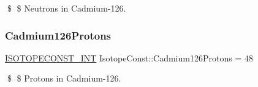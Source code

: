 \$ \$ Neutrons in Cadmium-\/126. \mbox{\label{group___isotope_const-_cadmium-_cd126_ga3212f41123f08555e577f4da867f83cd}} 
\subsubsection{\texorpdfstring{Cadmium126\+Protons}{Cadmium126Protons}}
{\footnotesize\ttfamily \mbox{\hyperlink{group___isotope_const-_macros_ga5f18360b3e99483a35c32d789e62621c}{I\+S\+O\+T\+O\+P\+E\+C\+O\+N\+S\+T\+\_\+\+I\+NT}} Isotope\+Const\+::\+Cadmium126\+Protons = 48}

\$ \$ Protons in Cadmium-\/126. 